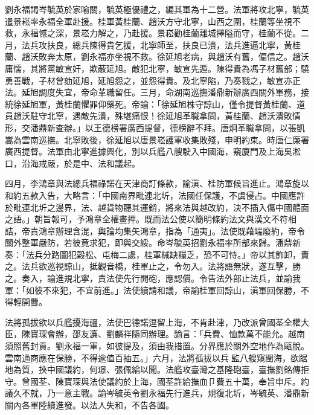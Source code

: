 \begin{pinyinscope}
劉永福謁岑毓英於家喻關，毓英極優禮之，編其軍為十二營。法軍將攻北寧，毓英遣景崧率永福全軍赴援。桂軍黃桂蘭、趙沃方守北寧，山西之圍，桂蘭等坐視不救，永福憾之深，景崧力解之，乃赴援。景崧勸桂蘭離城擇隘而守，桂蘭不從。二月，法兵攻扶良，總兵陳得貴乞援，北寧師至，扶良已潰，法兵進逼北寧，黃桂蘭、趙沃敗奔太原，劉永福亦坐視不救。徐延旭老病，與趙沃有舊，偏信之。趙沃庸懦，其將黨敏宣奸，欺蔽延旭。敵犯北寧，敏宣先遁。陳得貴為馮子材舊部；驍勇善戰，子材曾劾延旭，延旭怨之，並怨得貴。及北寧陷，乃奏戮之，敏宣亦正法。延旭調度失宜，帝命革職留任。三月，命湖南巡撫潘鼎新辦廣西關外軍務，接統徐延旭軍，黃桂蘭懼罪仰藥死。帝諭：「徐延旭株守諒山，僅令提督黃桂蘭、道員趙沃駐守北寧，遇敵先潰，殊堪痛恨！徐延旭革職拿問，黃桂蘭、趙沃潰敗情形，交潘鼎新查辦。」以王德榜署廣西提督，德榜辭不拜。唐炯革職拿問，以張凱嵩為雲南巡撫。北寧敗後，徐延旭以唐景崧護軍收集敗殘，申明約束。時唐仁廉署廣西提督。法軍由北寧進據興化，別以兵艦八艘駛入中國海，窺廈門及上海吳淞口，沿海戒嚴，於是中、法和議起。

四月，李鴻章與法總兵福祿諾在天津商訂條款，諭滇、桂防軍候旨進止。鴻章旋以和約五款入告，大略言：「中國南界毗連北圻，法國任保護，不虞侵占。中國應許於毗連北圻之邊界，法、越貨物聽其運銷，將來法與越改約，決不插入傷中國體面之語。」朝旨報可，予鴻章全權畫押。既而法公使以簡明條約法文與漢文不符相詰，帝責鴻章辦理含混，輿論均集矢鴻章，指為「通夷」。法使既藉端廢約，帝令關外整軍嚴防，若彼竟求犯，即與交綏。命岑毓英招劉永福率所部來歸。潘鼎新奏：「法兵分路圖犯穀松、屯梅二處，桂軍械缺糧乏，恐不可恃。」帝以其飾卸，責之。法兵欲巡視諒山，抵觀音橋，桂軍止之，令勿入。法將語無狀，遂互擊，勝之。奏入，諭進規北寧，責法使先行開砲，應認償。令告法外部止法兵，並諭我軍：「如彼不來犯，不宜前進。」法使續請和議，帝諭桂軍回諒山，滇軍回保勝，不得輕開釁。

法將孤拔欲以兵艦擾海疆，法使巴德諾逗留上海，不肯赴津，乃改派曾國荃全權大臣，陳寶琛會辦，邵友濂、劉麟祥隨同辦理。諭言：「兵費、恤款萬不能允。越南須照舊封貢。劉永福一軍，如彼提及，須由我措置。分界應於關外空地作為甌脫。雲南通商應在保勝，不得逾值百抽五。」六月，法將孤拔以兵監八艘窺閩海，欲踞地為質，挾中國議約，何璟、張佩綸以聞。法艦攻臺灣之基隆砲臺，臺撫劉銘傳拒守。曾國荃、陳寶琛與法使議約於上海，國荃許給撫血⼙費五十萬，奉旨申斥。約議久不就，乃一意主戰。諭岑毓英令劉永福先行進兵，規復北圻，岑毓英、潘鼎新關內各軍陸續進發。以法人失和，不告各國。


\end{pinyinscope}
